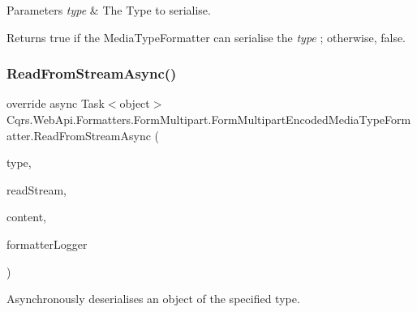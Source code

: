 \begin{DoxyParams}{Parameters}
{\em type} & The Type to serialise.\\
\hline
\end{DoxyParams}
\begin{DoxyReturn}{Returns}
true if the Media\+Type\+Formatter can serialise the {\itshape type} ; otherwise, false.
\end{DoxyReturn}
\mbox{\label{classCqrs_1_1WebApi_1_1Formatters_1_1FormMultipart_1_1FormMultipartEncodedMediaTypeFormatter_a4599833b528ecb762d9d5d2c72b11d90_a4599833b528ecb762d9d5d2c72b11d90}} 
\subsubsection{\texorpdfstring{Read\+From\+Stream\+Async()}{ReadFromStreamAsync()}}
{\footnotesize\ttfamily override async Task$<$object$>$ Cqrs.\+Web\+Api.\+Formatters.\+Form\+Multipart.\+Form\+Multipart\+Encoded\+Media\+Type\+Formatter.\+Read\+From\+Stream\+Async (\begin{DoxyParamCaption}\item[{Type}]{type,  }\item[{Stream}]{read\+Stream,  }\item[{Http\+Content}]{content,  }\item[{I\+Formatter\+Logger}]{formatter\+Logger }\end{DoxyParamCaption})}



Asynchronously deserialises an object of the specified type. 


